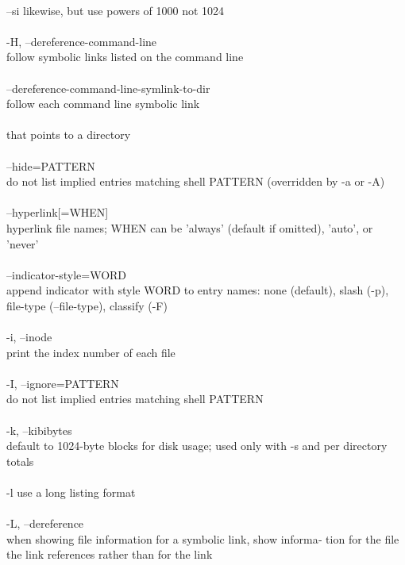 \documentclass{article}
\begin{document}
\\
       --si   likewise, but use powers of 1000 not 1024 \\
\\
       -H, --dereference-command-line \\
              follow symbolic links listed on the command line \\
\\
       --dereference-command-line-symlink-to-dir \\
              follow each command line symbolic link \\
\\
              that points to a directory \\
\\
       --hide=PATTERN \\
              do not list implied entries matching shell  PATTERN  (overridden
              by -a or -A) \\
\\
       --hyperlink[=WHEN] \\
              hyperlink file names; WHEN can be 'always' (default if omitted),
              'auto', or 'never' \\
\\
       --indicator-style=WORD \\
              append indicator with style WORD to entry names: none (default),
              slash (-p), file-type (--file-type), classify (-F) \\
\\
       -i, --inode \\
              print the index number of each file \\
\\
       -I, --ignore=PATTERN \\
              do not list implied entries matching shell PATTERN \\
\\
       -k, --kibibytes \\
              default  to  1024-byte  blocks for disk usage; used only with -s
              and per directory totals \\
\\
       -l     use a long listing format \\
\\
       -L, --dereference \\
              when showing file information for a symbolic link, show informa‐
              tion  for  the file the link references rather than for the link
\end{document}
